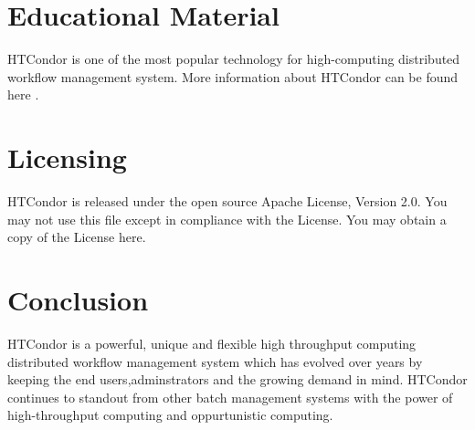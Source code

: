 \documentclass[9pt,twocolumn,twoside]{styles/osajnl}
\begin{document}
\section{Educational Material}

HTCondor is one of the most popular technology for high-computing
distributed workflow management system. More information about
HTCondor can be found here \cite{HTCondor_website}.

\section{Licensing}

HTCondor is released under the open source Apache License, Version
2.0. You may not use this file except in compliance with the
License. You may obtain a copy of the License
here\cite{HTCondor-License}.

\section{Conclusion}

HTCondor is a powerful, unique and flexible high throughput computing
distributed workflow management system which has evolved over years by
keeping the end users,adminstrators and the growing demand in
mind. HTCondor continues to standout from other batch management
systems with the power of high-throughput computing and oppurtunistic
computing.







\newpage

\appendix
\end{document}
